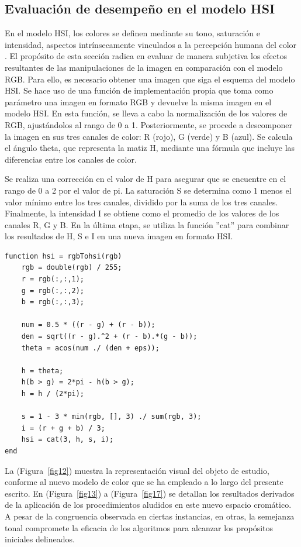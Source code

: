 \subsection{Evaluación de desempeño en el modelo HSI}

En el modelo HSI, los colores se definen mediante su tono, saturación e intensidad, aspectos intrínsecamente vinculados a la percepción humana del color \autocite{Rojas:2008}. El propósito de esta sección radica en evaluar de manera subjetiva los efectos resultantes de las manipulaciones de la imagen en comparación con el modelo RGB. Para ello, es necesario obtener una imagen que siga el esquema del modelo HSI. Se hace uso de una función de implementación propia que toma como parámetro una imagen en formato RGB y devuelve la misma imagen en el modelo HSI. En esta función, se lleva a cabo la normalización de los valores de RGB, ajustándolos al rango de 0 a 1. Posteriormente, se procede a descomponer la imagen en sus tres canales de color: R (rojo), G (verde) y B (azul). Se calcula el ángulo theta, que representa la matiz H, mediante una fórmula que incluye las diferencias entre los canales de color.

Se realiza una corrección en el valor de H para asegurar que se encuentre en el rango de 0 a 2 por el valor de pi. La saturación S se determina como 1 menos el valor mínimo entre los tres canales, dividido por la suma de los tres canales. Finalmente, la intensidad I se obtiene como el promedio de los valores de los canales R, G y B. En la última etapa, se utiliza la función ''cat'' para combinar los resultados de H, S e I en una nueva imagen en formato HSI.

 \begin{lstlisting}[style=Matlab-editor, caption=Fragmento del algoritmo K Means, basicstyle=\fontsize{8}{12}\selectfont]
function hsi = rgbTohsi(rgb)
    rgb = double(rgb) / 255;
    r = rgb(:,:,1);
    g = rgb(:,:,2);
    b = rgb(:,:,3);

    num = 0.5 * ((r - g) + (r - b));
    den = sqrt((r - g).^2 + (r - b).*(g - b));
    theta = acos(num ./ (den + eps));

    h = theta;
    h(b > g) = 2*pi - h(b > g); 
    h = h / (2*pi);
 
    s = 1 - 3 * min(rgb, [], 3) ./ sum(rgb, 3);
    i = (r + g + b) / 3;
    hsi = cat(3, h, s, i);
end
\end{lstlisting}

La (Figura~\ref{fig12}) muestra la representación visual del objeto de estudio, conforme al nuevo modelo de color que se ha empleado a lo largo del presente escrito. En (Figura~\ref{fig13}) a (Figura~\ref{fig17}) se detallan los resultados derivados de la aplicación de los procedimientos aludidos en este nuevo espacio cromático. A pesar de la congruencia observada en ciertas instancias, en otras, la semejanza tonal compromete la eficacia de los algoritmos para alcanzar los propósitos iniciales delineados.


